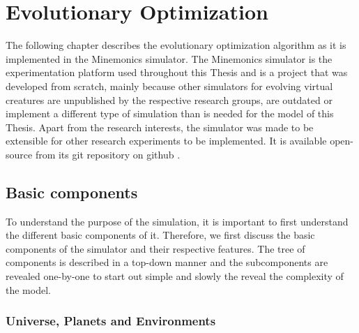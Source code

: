 \documentclass[main]{subfiles}
\begin{document}
\setcounter{chapter}{1}

\chapter{Evolutionary Optimization} %

\label{Chapter\thechapter} %


The following chapter describes the evolutionary optimization algorithm as it is implemented in the Minemonics simulator. %
%
The Minemonics simulator is the experimentation platform used throughout this Thesis and is a project that was developed from scratch, mainly because other simulators for evolving virtual creatures are unpublished by the respective research groups, are outdated or implement a different type of simulation than is needed for the model of this Thesis. %
%
Apart from the research interests, the simulator was made to be extensible for other research experiments to be implemented. %
%
It is available open-source from its git repository on github \cite{bib:Minemonics2016}.

\section{Basic components}

To understand the purpose of the simulation, it is important to first understand the different basic components of it. %
%
Therefore, we first discuss the basic components of the simulator and their respective features. %
%
The tree of components is described in a top-down manner and the subcomponents are revealed one-by-one to start out simple and slowly the reveal the complexity of the model. 

\subsection{Universe, Planets and Environments}
\end{document}
